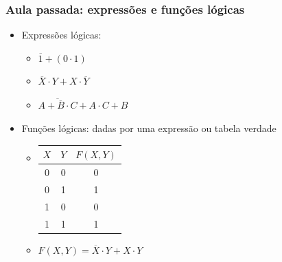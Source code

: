 \documentclass{beamer}
\begin{document}

\begin{frame}
 \frametitle{Aula passada: expressões e funções lógicas}

\begin{itemize}
\item Expressões lógicas:
  \begin{itemize}
    \item $\overline{1} + (0 \cdot 1)$\\[6pt]
    \item $\overline{X} \cdot Y + X \cdot \overline{Y}$\\[6pt]
    \item $\overline{ A + \overline{B} \cdot C } + A \cdot C + B$
  \end{itemize}
\item Funções lógicas: dadas por uma expressão ou tabela verdade
\vspace{6pt}
  \begin{itemize}
    \item
      \begin{tabular}{cc||c}
      $X$ & $Y$ & $F(X,Y)$ \\
      \hline
      0 & 0 & 0 \\
      0 & 1 & 1 \\
      1 & 0 & 0 \\
      1 & 1 & 1
      \end{tabular}
\vspace{6pt}
    \item $F(X,Y) = \overline{X} \cdot Y + X \cdot Y$
  \end{itemize}
\end{itemize}

\end{frame}

\end{document}

